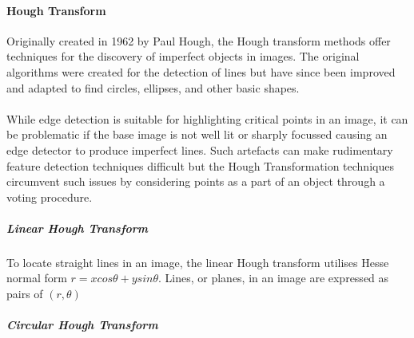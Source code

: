 	\paragraph{Hough Transform}\label{sec:lit_review_hough}
	Originally created in 1962 by Paul Hough, the Hough transform methods offer techniques for the discovery of imperfect objects in images. The original algorithms were created for the detection of lines but have since been improved and adapted to find circles, ellipses, and other basic shapes. 
	\\\\
	While edge detection is suitable for highlighting critical points in an image, it can be problematic if the base image is not well lit or sharply focussed causing an edge detector to produce imperfect lines. Such artefacts can make rudimentary feature detection techniques difficult but the Hough Transformation techniques circumvent such issues by considering points as a part of an object through a voting procedure.
	\subparagraph{Linear Hough Transform}
	To locate straight lines in an image, the linear Hough transform utilises Hesse normal form $r = x cos \theta + y sin \theta$. Lines, or planes, in an image are expressed as pairs of $(r, \theta)$ 
	\subparagraph{Circular Hough Transform}
	
